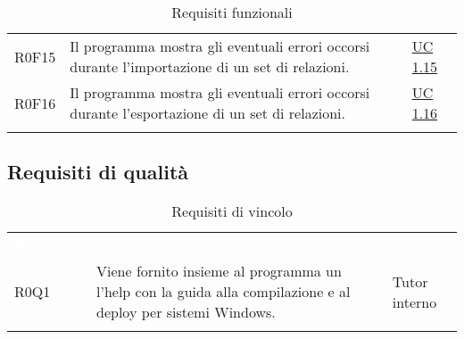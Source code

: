 \begin{center}
\begin{longtable}{p{4.2cm}!{\color{white}\vrule width 0.5mm}p{6cm}!{\color{white}\vrule width 0.5mm}p{2.5cm}!{\color{white}\vrule width 0.5mm}}
		\hspace{0mm}\hypertarget{XER0F15}{R0F15} & Il programma mostra gli eventuali errori occorsi durante l'importazione di un set di relazioni. & \hyperref[subsec:XEUC1.15]{UC 1.15}\\
		
		\hspace{0mm}\hypertarget{XER0F16}{R0F16} & Il programma mostra gli eventuali errori occorsi durante l'esportazione di un set di relazioni. & \hyperref[subsec:XEUC1.16]{UC 1.16}\\
		
		\hline
		\caption{Requisiti funzionali}
	\end{longtable}
\end{center}

\subsection{Requisiti di qualità}
\begin{center}
	\begin{longtable}{p{4.2cm}!{\color{white}\vrule width 0.5mm}p{6cm}!{\color{white}\vrule width 0.5mm}p{2.5cm}!{\color{white}\vrule width 0.5mm}}
		\textcolor{white}{\textbf{Requisito}}&\textcolor{white}{\textbf{Descrizione}}&\textcolor{white}{\textbf{Fonti}}\\
		
		\hspace{0mm}\hypertarget{R0Q1}{R0Q1} & Viene fornito insieme al programma un l'help con la guida alla compilazione e al deploy per sistemi Windows. & Tutor interno\\
		
		\hline
		\caption{Requisiti di vincolo}
	\end{longtable}
\end{center}

